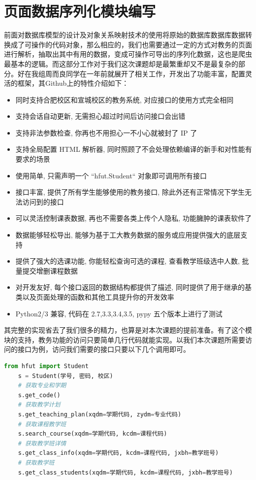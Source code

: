\documentclass[UTF8, zihao=-4]{ctexart}
\begin{document}
    
    
    \section{页面数据序列化模块编写}
    前面对数据库模型的设计及对象关系映射技术的使用将原始的数据库数据库数据转换成了可操作的代码对象，那么相应的，我们也需要通过一定的方式对教务的页面进行解析，抽取出其中有用的数据，变成可操作可导出的序列化数据，这也是爬虫最基本的逻辑。而这部分工作对于我们这次课题却是最繁重却又不是最复杂的部分。好在我组周而良同学在一年前就展开了相关工作，开发出了功能丰富，配置灵活的框架，其Github上的特性介绍\cite{er1iang/hfut}如下：
    
    \begin{itemize}
        \item 同时支持合肥校区和宣城校区的教务系统, 对应接口的使用方式完全相同
        \item 支持会话自动更新, 无需担心超过时间后访问接口会出错
        \item 支持非法参数检查, 你再也不用担心一不小心就被封了 IP 了
        \item 支持全局配置 HTML 解析器, 同时照顾了不会处理依赖编译的新手和对性能有要求的场景
        \item 使用简单, 只需声明一个  ``hfut.Student``  对象即可调用所有接口
        \item 接口丰富, 提供了所有学生能够使用的教务接口, 除此外还有正常情况下学生无法访问到的接口
        \item 可以灵活控制课表数据, 再也不需要各类上传个人隐私, 功能臃肿的课表软件了
        \item 数据能够轻松导出, 能够为基于工大教务数据的服务或应用提供强大的底层支持
        \item 提供了强大的选课功能, 你能轻松查询可选的课程, 查看教学班级选中人数, 批量提交增删课程数据
        \item 对开发友好, 每个接口返回的数据结构都提供了描述, 同时提供了用于继承的基类以及页面处理的函数和其他工具提升你的开发效率
        \item Python2/3 兼容, 代码在 2.7,3.3,3.4,3.5, pypy 五个版本上进行了测试
    \end{itemize}
    
    其完整的实现省去了我们很多的精力，也算是对本次课题的提前准备。有了这个模块的支持，教务功能的访问只要简单几行代码就能实现。以我们本次课题所需要访问的接口为例，访问我们需要的接口只要以下几个调用即可。
    
    \begin{lstlisting}[language=Python]
    from hfut import Student
    s = Student(学号, 密码, 校区)
    # 获取专业和学期
    s.get_code()
    # 获取教学计划
    s.get_teaching_plan(xqdm=学期代码, zydm=专业代码)
    # 获取课程教学班
    s.search_course(xqdm=学期代码, kcdm=课程代码)
    # 获取教学班详情
    s.get_class_info(xqdm=学期代码, kcdm=课程代码, jxbh=教学班号)
    # 获取教学班
    s.get_class_students(xqdm=学期代码, kcdm=课程代码, jxbh=教学班号)
    \end{lstlisting}
    
\end{document}
